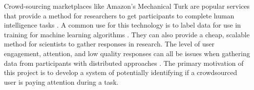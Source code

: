 \documentclass{article}
\begin{document}








Crowd-sourcing marketplaces like Amazon’s Mechanical Turk are popular services that provide a method for researchers to get participants to complete human intelligence tasks \cite{paolacci2010running}. 
A common use for this technology is to label data for use in training for machine learning algorithms \cite{chang2017revolt}.
They can also provide a cheap, scalable method for scientists to gather responses in research.
The level of user engagement, attention, and low quality responses can all be issues when gathering data from participants with distributed approaches \cite{ipeirotis2010quality}.
The primary motivation of this project is to develop a system of potentially identifying if a crowdsourced user is paying attention during a task.
\end{document}

